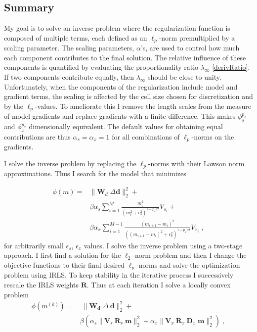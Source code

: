 \subsection{Summary}
My goal is to solve an inverse problem where the regularization function is composed of multiple terms, each defined as an $\ell_p$-norm premultiplied by a scaling parameter. The scaling parameters, $\alpha$'s, are used to control how much each component contributes to the final solution. The relative influence of these components is quantified by evaluating the proportionality ratio $\lambda_\infty$ \eqref{derivRatio}. If two components contribute equally, then $\lambda_\infty$ should be close to unity. Unfortunately, when the components of the regularization include model and gradient terms, the scaling is affected by the cell size chosen for discretization and by the $\ell_p$-values. To ameliorate this I remove the length scales from the measure of model gradients and replace gradients with a finite difference. This makes $\phi_s^{p_s}$ and $\phi_x^{p_x}$ dimensionally equivalent. The default values for obtaining equal contributions are thus $\alpha_s=\alpha_x=1$ for all combinations of $\ell_p$-norms on the gradients.

I solve the inverse problem by replacing the $\ell_p$-norms with their Lawson norm approximations. Thus I search for the model that minimizes

\begin{equation}\label{eq:GeneralLPProblem}
\begin{split}
\phi (m) =& \| \mathbf{W}_d\;\Delta\mathbf{d}\|_2^2 +\\
& \beta \alpha_s \sum_{i=1}^{M}\frac{m_i^2}{{{(m_i^{2} + \epsilon_s^2 )}^{1-p_s/2}} } V_{s_i} +\\
& \beta \alpha_x \sum_{i=1}^{M-1}\frac{(m_{i+1} - m_{i})^2}{{{((m_{i+1} - m_{i})^{2} + \epsilon_x^2 )}^{1-p_x/2}} } V_{x_i} \;,
\end{split}
\end{equation}
for arbitrarily small $\epsilon_s$, $\epsilon_x$ values.
I solve the inverse problem using a two-stage approach. I first find a solution for the $\ell_2$-norm problem and then I change the objective functions to their final desired $\ell_p$-norms and solve the optimization problem using IRLS. To keep stability in the iterative process I successively rescale the IRLS weights $\mathbf{R}$. Thus at each iteration I solve a locally convex problem
\begin{equation}\label{eq:LocalIRLS}
\begin{split}
\phi(m^{(k)}) =&\;\| \mathbf{W_\text{d}}\;\Delta\:\mathbf{d}\|_2^2 +\\
& \beta \left( \alpha_s \| \mathbf{V}_s\:\mathbf{R}_s\;\mathbf{m}\|_2^2 + \alpha_x\|\mathbf{V}_x\:\mathbf{R}_x\:\mathbf{D}_x\;\mathbf{m}\|_2^2 \right) \;,
\end{split}
\end{equation}

